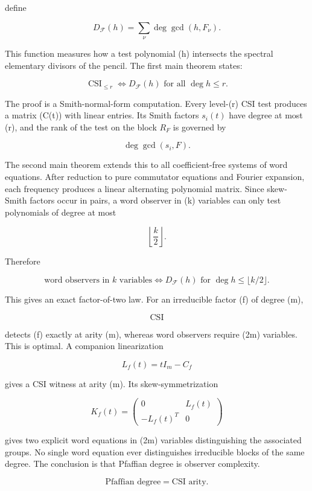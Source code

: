 \documentclass[11pt]{article}
\begin{document}
define

\[
D_{\mathcal F}(h)
=\sum_\nu
\deg\gcd(h,F_\nu).
\]

This function measures how a test polynomial (h) intersects the spectral elementary divisors of the pencil. The first main theorem states:

\[
\boxed{
\operatorname{CSI}_{\le r}
\Longleftrightarrow
D_{\mathcal F}(h)\text{ for all }\deg h\le r.
}
\]

The proof is a Smith-normal-form computation. Every level-(r) CSI test produces a matrix (C(t)) with linear entries. Its Smith factors $s_i(t)$ have degree at most (r), and the rank of the test on the block $R_F$ is governed by

\[
\deg\gcd(s_i,F).
\]

The second main theorem extends this to all coefficient-free systems of word equations. After reduction to pure commutator equations and Fourier expansion, each frequency produces a linear alternating polynomial matrix. Since skew-Smith factors occur in pairs, a word observer in (k) variables can only test polynomials of degree at most

\[
\left\lfloor\frac k2\right\rfloor.
\]

Therefore

\[
\boxed{
\text{word observers in }k\text{ variables}
\Longleftrightarrow
D_{\mathcal F}(h)\text{ for }\deg h\le\lfloor k/2\rfloor.
}
\]

This gives an exact factor-of-two law. For an irreducible factor (f) of degree (m),

\[
\operatorname{CSI}
\]

detects (f) exactly at arity (m), whereas word observers require (2m) variables. This is optimal. A companion linearization

\[
L_f(t)=tI_m-C_f
\]

gives a CSI witness at arity (m). Its skew-symmetrization

\[
K_f(t)=
\begin{pmatrix}
0 & L_f(t)\\
-L_f(t)^T & 0
\end{pmatrix}
\]

gives two explicit word equations in (2m) variables distinguishing the associated groups. No single word equation ever distinguishes irreducible blocks of the same degree. The conclusion is that Pfaffian degree is observer complexity.

\[
\boxed{
\text{Pfaffian degree}=
\text{CSI arity}.
}
\]
\end{document}

